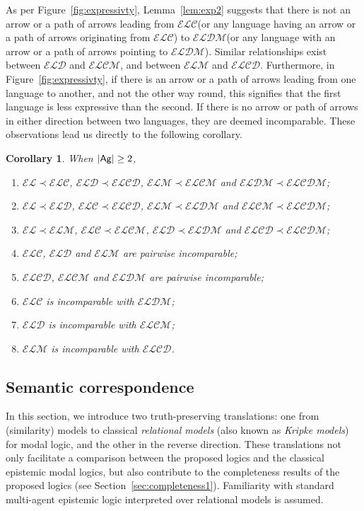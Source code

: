 \documentclass{article}
\newtheorem{corollary}[theorem]{Corollary}%
\newcommand{\ag}{\text{\normalfont\textsf{Ag}}\xspace}
\newcommand{\lang}{\ensuremath{\mathcal{EL}}\xspace}
\newcommand{\langc}{\ensuremath{\mathcal{ELC}}\xspace}
\newcommand{\langd}{\ensuremath{\mathcal{ELD}}\xspace}
\newcommand{\langm}{\ensuremath{\mathcal{ELM}}\xspace}
\newcommand{\langcd}{\ensuremath{\mathcal{ELCD}}\xspace}
\newcommand{\langcm}{\ensuremath{\mathcal{ELCM}}\xspace}
\newcommand{\langdm}{\ensuremath{\mathcal{ELDM}}\xspace}
\newcommand{\langcdm}{\ensuremath{\mathcal{ELCDM}}\xspace}
\begin{document}
As per Figure~\ref{fig:expressivty}, Lemma~\ref{lem:exp2} suggests that there is not an arrow or a path of arrows leading from \langc (or any language having an arrow or a path of arrows originating from \langc) to \langdm (or any language with an arrow or a path of arrows pointing to \langdm). Similar relationships exist between \langd and \langcm, and between \langm and \langcd. Furthermore, in Figure~\ref{fig:expressivty}, if there is an arrow or a path of arrows leading from one language to another, and not the other way round, this signifies that the first language is less expressive than the second. If there is no arrow or path of arrows in either direction between two languages, they are deemed incomparable. These observations lead us directly to the following corollary.

\begin{corollary}
When $|\ag|\geq 2$,
\begin{enumerate}
\item $\lang \prec \langc$, $\langd \prec \langcd$, $\langm \prec \langcm$ and $\langdm \prec \langcdm$;
\item $\lang \prec \langd$, $\langc \prec \langcd$, $\langm \prec \langdm$ and $\langcm \prec \langcdm$;
\item $\lang \prec \langm$, $\langc \prec \langcm$, $\langd \prec \langdm$ and $\langcd \prec \langcdm$;
\item \langc, \langd and \langm are pairwise incomparable;
\item \langcd, \langcm and \langdm are pairwise incomparable;
\item \langc is incomparable with \langdm;
\item \langd is incomparable with \langcm;
\item \langm is incomparable with \langcd.
\end{enumerate}
\end{corollary}


\subsection{Semantic correspondence}
\label{sec:correspondence}

In this section, we introduce two truth-preserving translations: one from (similarity) models to classical \emph{relational models} (also known as \emph{Kripke models}) for modal logic, and the other in the reverse direction. These translations not only facilitate a comparison between the proposed logics and the classical epistemic modal logics, but also contribute to the completeness results of the proposed logics (see Section~\ref{sec:completeness1}). Familiarity with standard multi-agent epistemic logic interpreted over relational models is assumed.
\end{document}
